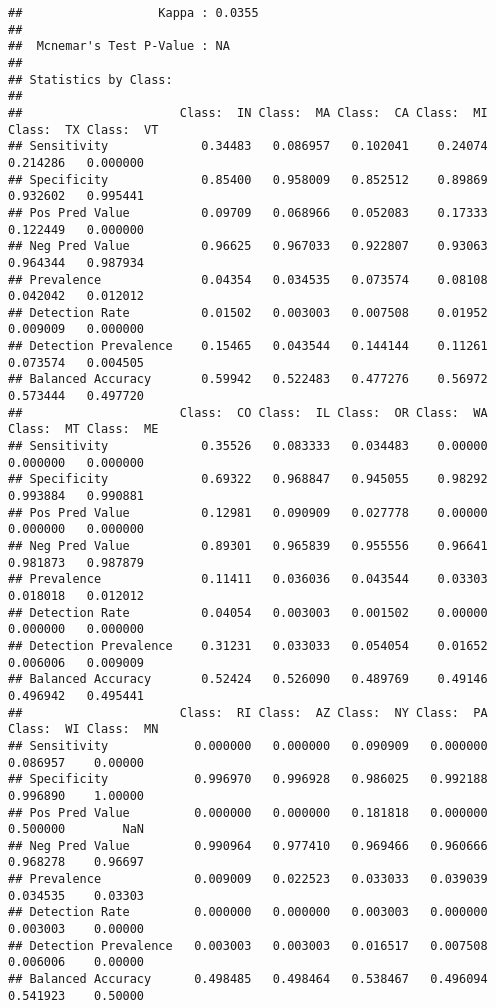 \documentclass[
]{article}
\begin{document}
\begin{verbatim}
##                   Kappa : 0.0355          
##                                           
##  Mcnemar's Test P-Value : NA              
## 
## Statistics by Class:
## 
##                      Class:  IN Class:  MA Class:  CA Class:  MI Class:  TX Class:  VT
## Sensitivity             0.34483   0.086957   0.102041    0.24074   0.214286   0.000000
## Specificity             0.85400   0.958009   0.852512    0.89869   0.932602   0.995441
## Pos Pred Value          0.09709   0.068966   0.052083    0.17333   0.122449   0.000000
## Neg Pred Value          0.96625   0.967033   0.922807    0.93063   0.964344   0.987934
## Prevalence              0.04354   0.034535   0.073574    0.08108   0.042042   0.012012
## Detection Rate          0.01502   0.003003   0.007508    0.01952   0.009009   0.000000
## Detection Prevalence    0.15465   0.043544   0.144144    0.11261   0.073574   0.004505
## Balanced Accuracy       0.59942   0.522483   0.477276    0.56972   0.573444   0.497720
##                      Class:  CO Class:  IL Class:  OR Class:  WA Class:  MT Class:  ME
## Sensitivity             0.35526   0.083333   0.034483    0.00000   0.000000   0.000000
## Specificity             0.69322   0.968847   0.945055    0.98292   0.993884   0.990881
## Pos Pred Value          0.12981   0.090909   0.027778    0.00000   0.000000   0.000000
## Neg Pred Value          0.89301   0.965839   0.955556    0.96641   0.981873   0.987879
## Prevalence              0.11411   0.036036   0.043544    0.03303   0.018018   0.012012
## Detection Rate          0.04054   0.003003   0.001502    0.00000   0.000000   0.000000
## Detection Prevalence    0.31231   0.033033   0.054054    0.01652   0.006006   0.009009
## Balanced Accuracy       0.52424   0.526090   0.489769    0.49146   0.496942   0.495441
##                      Class:  RI Class:  AZ Class:  NY Class:  PA Class:  WI Class:  MN
## Sensitivity            0.000000   0.000000   0.090909   0.000000   0.086957    0.00000
## Specificity            0.996970   0.996928   0.986025   0.992188   0.996890    1.00000
## Pos Pred Value         0.000000   0.000000   0.181818   0.000000   0.500000        NaN
## Neg Pred Value         0.990964   0.977410   0.969466   0.960666   0.968278    0.96697
## Prevalence             0.009009   0.022523   0.033033   0.039039   0.034535    0.03303
## Detection Rate         0.000000   0.000000   0.003003   0.000000   0.003003    0.00000
## Detection Prevalence   0.003003   0.003003   0.016517   0.007508   0.006006    0.00000
## Balanced Accuracy      0.498485   0.498464   0.538467   0.496094   0.541923    0.50000

\end{verbatim}
\end{document}
